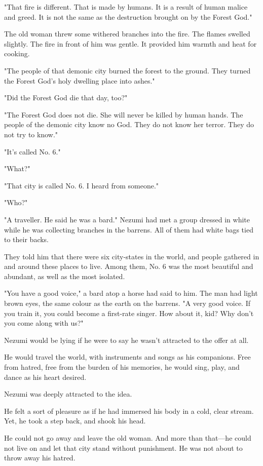 "That fire is different. That is made by humans. It is a result of human
malice and greed. It is not the same as the destruction brought on by
the Forest God."

The old woman threw some withered branches into the fire. The flames
swelled slightly. The fire in front of him was gentle. It provided him
warmth and heat for cooking.

"The people of that demonic city burned the forest to the ground. They
turned the Forest God's holy dwelling place into ashes."

"Did the Forest God die that day, too?"

"The Forest God does not die. She will never be killed by human hands.
The people of the demonic city know no God. They do not know her terror.
They do not try to know."

"It's called No. 6."

"What?"

"That city is called No. 6. I heard from someone."

"Who?"

"A traveller. He said he was a bard." Nezumi had met a group dressed in
white while he was collecting branches in the barrens. All of them had
white bags tied to their backs.

They told him that there were six city-states in the world, and people
gathered in and around these places to live. Among them, No. 6 was the
most beautiful and abundant, as well as the most isolated.

"You have a good voice," a bard atop a horse had said to him. The man
had light brown eyes, the same colour as the earth on the barrens. "A
very good voice. If you train it, you could become a first-rate singer.
How about it, kid? Why don't you come along with us?"

Nezumi would be lying if he were to say he wasn't attracted to
the offer at all.

He would travel the world, with instruments and songs as his companions.
Free from hatred, free from the burden of his memories, he would sing,
play, and dance as his heart desired.

Nezumi was deeply attracted to the idea.

He felt a sort of pleasure as if he had immersed his body in a cold,
clear stream. Yet, he took a step back, and shook his head.

He could not go away and leave the old woman. And more than that---he
could not live on and let that city stand without punishment. He was not
about to throw away his hatred.

